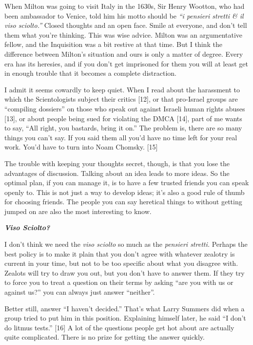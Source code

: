 When Milton was going to visit Italy in the 1630s, Sir Henry Wootton,
who had been ambassador to Venice, told him his motto should be
\emph{``i pensieri stretti \& il viso sciolto.''} Closed thoughts and an
open face. Smile at everyone, and don't tell them what you're thinking.
This was wise advice. Milton was an argumentative fellow, and the
Inquisition was a bit restive at that time. But I think the difference
between Milton's situation and ours is only a matter of degree. Every
era has its heresies, and if you don't get imprisoned for them you will
at least get in enough trouble that it becomes a complete distraction.

I admit it seems cowardly to keep quiet. When I read about the
harassment to which the Scientologists subject their critics {[}12{]},
or that pro-Israel groups are ``compiling dossiers'' on those who speak
out against Israeli human rights abuses {[}13{]}, or about people being
sued for violating the DMCA {[}14{]}, part of me wants to say, ``All
right, you bastards, bring it on.'' The problem is, there are so many
things you can't say. If you said them all you'd have no time left for
your real work. You'd have to turn into Noam Chomsky. {[}15{]}

The trouble with keeping your thoughts secret, though, is that you lose
the advantages of discussion. Talking about an idea leads to more ideas.
So the optimal plan, if you can manage it, is to have a few trusted
friends you can speak openly to. This is not just a way to develop
ideas; it's also a good rule of thumb for choosing friends. The people
you can say heretical things to without getting jumped on are also the
most interesting to know.

\textbf{\emph{Viso Sciolto?}}

I don't think we need the \emph{viso sciolto} so much as the
\emph{pensieri stretti.} Perhaps the best policy is to make it plain
that you don't agree with whatever zealotry is current in your time, but
not to be too specific about what you disagree with. Zealots will try to
draw you out, but you don't have to answer them. If they try to force
you to treat a question on their terms by asking ``are you with us or
against us?'' you can always just answer ``neither''.

Better still, answer ``I haven't decided.'' That's what Larry Summers
did when a group tried to put him in this position. Explaining himself
later, he said ``I don't do litmus tests.'' {[}16{]} A lot of the
questions people get hot about are actually quite complicated. There is
no prize for getting the answer quickly.

